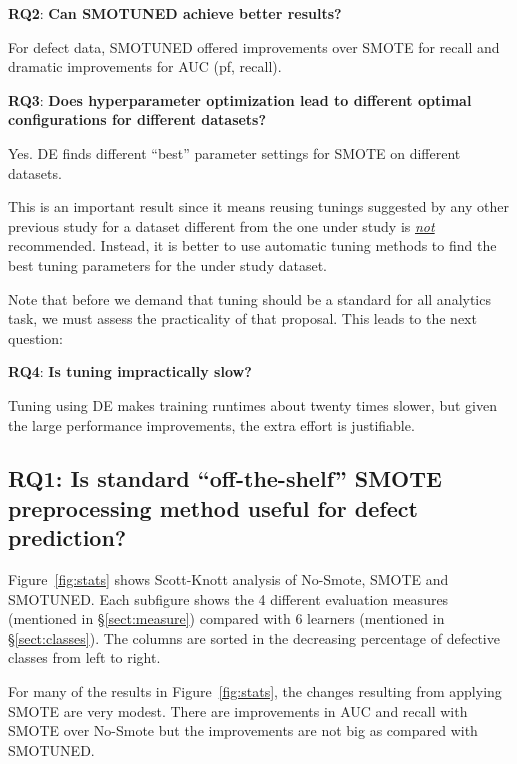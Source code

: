 \documentclass[10pt,conference]{IEEEtran}
\theoremstyle{break}
\theoremstyle{break}
\newcommand{\tion}[1]{{\S}\ref{sect:#1}}
\newcommand{\sma}{{\sc SMOTE}}
\newcommand{\smb}{{\sc SMOTUNED}}
\begin{document}
 

 \textbf{RQ2}: \textbf{Can {\smb} achieve better results?} 
 
 \begin{lesson}For defect data, {\smb}  
 offered    improvements over {\sma} for recall
 and dramatic improvements for AUC (pf, recall).
 \end{lesson}
 
 \textbf{RQ3}: \textbf{Does hyperparameter optimization lead to different optimal configurations for different datasets?} 
 
 \begin{lesson}Yes. DE finds different ``best'' parameter settings for {\sma} on different datasets.
 \end{lesson}
  This is an important result
  since it means
  reusing tunings suggested  by  any other  previous study  for a dataset different from the one under study is \underline{{\em not}} recommended. Instead,  it is better to
      use automatic tuning  methods  to find the best tuning parameters for the 
      under study dataset.
      
       Note that
 before we demand that tuning should be a
 standard for all analytics task,
 we must assess the practicality of that
 proposal. This leads to the next question:
 
   \textbf{RQ4}: \textbf{Is tuning 
   impractically
   slow?} 
 
 \begin{lesson}Tuning using DE makes training runtimes about twenty times slower, but given
 the large performance improvements,
 the extra effort is justifiable. \end{lesson}
 
 



\subsection{\textbf{RQ1: Is standard ``off-the-shelf'' SMOTE preprocessing method useful for defect prediction?}}

Figure~\ref{fig:stats} shows Scott-Knott analysis of No-Smote, SMOTE and SMOTUNED. Each subfigure shows the 4 different evaluation measures (mentioned in \tion{measure}) compared with 6 learners (mentioned in \tion{classes}). The columns are sorted in the decreasing percentage of defective classes from left to right.

For many of the results in Figure~\ref{fig:stats}, the changes
resulting from applying SMOTE are very modest. There are improvements in AUC and recall with SMOTE over No-Smote but the improvements are not big as compared with SMOTUNED.
\end{document}
